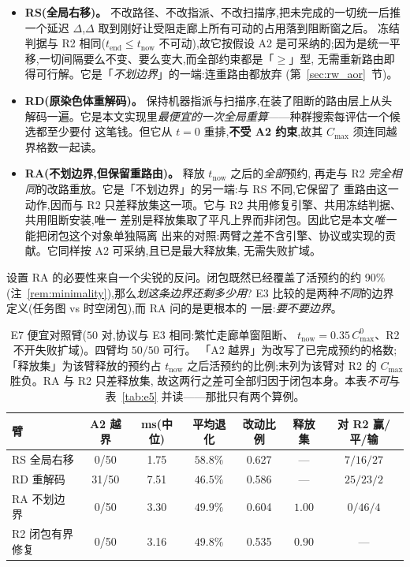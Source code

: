 \documentclass[manuscript,screen,review]{acmart}
\newcommand{\NPairs}{50}
\newcommand{\ClosureAliveFrac}{90\%}
\newcommand{\MsShift}{1.75}          %
\newcommand{\MsRedecode}{7.51}       %
\newcommand{\MsAllFuture}{3.30}      %
\newcommand{\MsCheapRtwo}{3.16}      %
\newcommand{\ShiftBad}{0/\NPairs}    %
\newcommand{\RedecodeBad}{31/\NPairs}
\newcommand{\ResFracCheapRtwo}{0.535}
\newcommand{\ResFracShift}{0.627}
\newcommand{\ResFracRedecode}{0.586}
\newcommand{\ResFracAllFuture}{0.604}
\newcommand{\ClosureShareMean}{0.90} %
\begin{document}
\begin{itemize}[leftmargin=1.5em,itemsep=0.25em]
\item \textbf{RS(全局右移)。} 不改路径、不改指派、不改扫描序,把未完成的一切统一后推
一个延迟 \(\Delta\),\(\Delta\) 取到刚好让受阻走廊上所有可动的占用落到阻断窗之后。
冻结判据与 R2 相同(\(t_{\mathrm{end}}\le t_{\mathrm{now}}\) 不可动),故它按假设 A2
是可采纳的;因为是统一平移,一切间隔要么不变、要么变大,而全部约束都是「\(\ge\)」型,
无需重新路由即得可行解。它是「\emph{不划边界}」的一端:连重路由都放弃
(第~\ref{sec:rw_aor}~节)。
\item \textbf{RD(原染色体重解码)。} 保持机器指派与扫描序,在装了阻断的路由层上从头
解码一遍。它是本文实现里\emph{最便宜的一次全局重算}——种群搜索每评估一个候选都至少要付
这笔钱。但它从 \(t=0\) 重排,\textbf{不受 A2 约束},故其 \(C_{\max}\) 须连同越界格数一起读。
\item \textbf{RA(不划边界,但保留重路由)。} 释放 \(t_{\mathrm{now}}\) 之后的\emph{全部}预约,
再走与 R2 \emph{完全相同}的改路重放。它是「不划边界」的另一端:与 RS 不同,它保留了
重路由这一动作,因而与 R2 只差释放集这一项。它与 R2 共用修复引擎、共用冻结判据、共用阻断安装,唯一
差别是释放集取了平凡上界而非闭包。因此它是本文\emph{唯一}能把闭包这个对象单独隔离
出来的对照:两臂之差不含引擎、协议或实现的贡献。它同样按 A2 可采纳,且已是最大释放集,
无需失败扩域。
\end{itemize}

设置 RA 的必要性来自一个尖锐的反问。闭包既然已经覆盖了活预约的约
\ClosureAliveFrac(注~\ref{rem:minimality}),那么\emph{划这条边界还剩多少用}?
E3 比较的是两种\emph{不同}的边界定义(任务图 vs 时空闭包),而 RA 问的是更根本的
一层:\emph{要不要边界}。

\begin{table}[t]
\centering
\caption{E7 便宜对照臂(\(\NPairs\) 对,协议与 E3 相同:繁忙走廊单窗阻断、
\(t_{\mathrm{now}}=0.35\,C_{\max}^{0}\)、R2 不开失败扩域)。四臂均 \(\NPairs/\NPairs\) 可行。
「A2 越界」为改写了已完成预约的格数;「释放集」为该臂释放的预约占 \(t_{\mathrm{now}}\)
之后活预约的比例;末列为该臂对 R2 的 \(C_{\max}\) 胜负。RA 与 R2 只差释放集,
故这两行之差可全部归因于闭包本身。本表\emph{不可}与表~\ref{tab:e5} 并读——那批只有两个算例。}
\label{tab:cheap}
\small
\begin{tabular}{@{}lcccccc@{}}
\toprule
臂 & A2 越界 & ms(中位) & 平均退化 & 改动比例 & 释放集 & 对 R2 赢/平/输 \\
\midrule
RS 全局右移      & \ShiftBad     & \MsShift    & \(58.8\%\) & \ResFracShift    & ---   & \(7/16/27\) \\
RD 重解码        & \RedecodeBad  & \MsRedecode & \(46.5\%\) & \ResFracRedecode & ---   & \(25/23/2\) \\
RA 不划边界      & \ShiftBad     & \MsAllFuture & \(49.9\%\) & \ResFracAllFuture & \(1.00\) & \(0/46/4\) \\
R2 闭包有界修复  & \ShiftBad     & \MsCheapRtwo & \(49.8\%\) & \ResFracCheapRtwo & \ClosureShareMean & --- \\
\bottomrule
\end{tabular}
\end{table}
\end{document}
